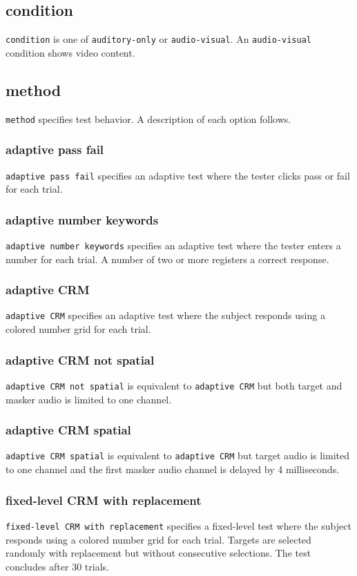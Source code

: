 \documentclass[11pt,pdftex,letterpaper]{article}
\begin{document}
\subsection{condition}
\texttt{condition} is one of \texttt{auditory-only} or \texttt{audio-visual}. An \texttt{audio-visual} condition shows video content.
\subsection{method}
\texttt{method} specifies test behavior. A description of each option follows.
\subsubsection{adaptive pass fail}
\texttt{adaptive pass fail} specifies an adaptive test where the tester clicks pass or fail for each trial.
\subsubsection{adaptive number keywords}
\texttt{adaptive number keywords} specifies an adaptive test where the tester enters a number for each trial. A number of two or more registers a correct response.
\subsubsection{adaptive CRM}
\texttt{adaptive CRM} specifies an adaptive test where the subject responds using a colored number grid for each trial.
\subsubsection{adaptive CRM not spatial}
\texttt{adaptive CRM not spatial} is equivalent to \texttt{adaptive CRM} but both target and masker audio is limited to one channel.
\subsubsection{adaptive CRM spatial}
\texttt{adaptive CRM spatial} is equivalent to \texttt{adaptive CRM} but target audio is limited to one channel and the first masker audio channel is delayed by 4 milliseconds.
\subsubsection{fixed-level CRM with replacement}
\texttt{fixed-level CRM with replacement} specifies a fixed-level test where the subject responds using a colored number grid for each trial. Targets are selected randomly with replacement but without consecutive selections. The test concludes after 30 trials.
\end{document}
